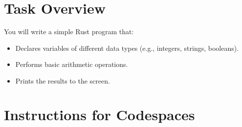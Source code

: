 \documentclass[12pt]{article}
\begin{document}
	\section*{Task Overview}
	You will write a simple Rust program that:
	\begin{itemize}
		\item Declares variables of different data types (e.g., integers, strings, booleans).
		\item Performs basic arithmetic operations.
		\item Prints the results to the screen.
	\end{itemize}
	
	\section*{Instructions for Codespaces}
\end{document}
